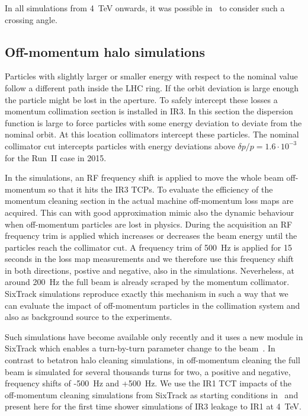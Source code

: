 In all simulations from 4~TeV onwards, it was possible in \fluka~to consider such a crossing angle.

\subsection{Off-momentum halo simulations}
Particles with slightly larger or smaller energy with respect to the nominal value follow a different path inside the LHC ring. If the orbit deviation is large enough the particle might be lost in the aperture. To safely intercept these losses a momentum collimation section is installed in IR3. In this section the dispersion function is large to force particles with some energy deviation to deviate from the nominal orbit. At this location collimators intercept these particles. The nominal collimator cut intercepts particles with energy deviations above $\delta p/p = 1.6\cdot 10^{-3}$ for the Run~II case in 2015.


In the simulations, an RF frequency shift is applied to move the whole beam off-momentum so that it hits the IR3 TCPs. To evaluate the efficiency of the momentum cleaning section in the actual machine off-momentum loss maps are acquired. This can with good approximation mimic also the dynamic behaviour when off-momentum particles are lost in physics. During the acquisition an RF frequency trim is applied which increases or decreases the beam energy until the particles reach the collimator cut. A frequency trim of 500~Hz is applied for 15 seconds in the loss map measurements and we therefore use this frequency shift in both directions, postive and negative, also in the simulations. Neverheless, at around 200~Hz the full beam is already scraped by the momentum collimator. SixTrack simulations reproduce exactly this mechanism in such a way that we can evaluate the impact of off-momentum particles in the collimation system and also as background source to the experiments.

Such simulations have become available only recently and it uses a new module in SixTrack which enables a turn-by-turn parameter change to the beam~\cite{KyrreIpac2015}. In contrast to betatron halo cleaning simulations, in off-momentum cleaning the full beam is simulated for several thousands turns for two, a positive and negative, frequency shifts of -500~Hz and +500~Hz. %
We use the IR1 TCT impacts of the off-momentum cleaning simulations from SixTrack as starting conditions in \fluka~and present here for the first time shower simulations of IR3 leakage to IR1 at 4~TeV. 


